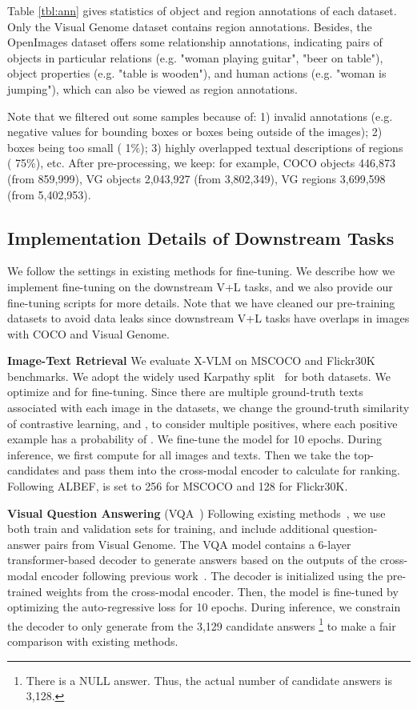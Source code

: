 \documentclass[nohyperref]{article}
\theoremstyle{plain}
\theoremstyle{definition}
\theoremstyle{remark}
\begin{document}
Table \ref{tbl:ann} gives statistics of object and region annotations of each dataset. Only the Visual Genome dataset contains region annotations. Besides, the OpenImages dataset offers some relationship annotations, indicating pairs of objects in particular relations (e.g. "woman playing guitar", "beer on table"), object properties (e.g. "table is wooden"), and human actions (e.g. "woman is jumping"), which can also be viewed as region annotations. 


Note that we filtered out some samples because of: 1) invalid annotations (e.g. negative values for bounding boxes or boxes being outside of the images); 2) boxes being too small ( 1\%); 3) highly overlapped textual descriptions of regions ( 75\%), etc. After pre-processing, we keep: for example, COCO objects 446,873 (from 859,999), VG objects 2,043,927 (from 3,802,349), VG regions 3,699,598 (from 5,402,953). 


\subsection{Implementation Details of Downstream Tasks}
\label{app:details}


We follow the settings in existing methods for fine-tuning. 
We describe how we implement fine-tuning on the downstream V+L tasks, and we also provide our fine-tuning scripts for more details. Note that we have cleaned our pre-training datasets to avoid data leaks since downstream V+L tasks have overlaps in images with COCO and Visual Genome. 


\noindent \textbf{Image-Text Retrieval} We evaluate X-VLM on MSCOCO and Flickr30K~\cite{plummer2015flickr30k} benchmarks. We adopt the widely used Karpathy split~\cite{karpathy2015deep} for both datasets. We optimize  and  for fine-tuning. Since there are multiple ground-truth texts associated with each image in the datasets, we change the ground-truth similarity of contrastive learning,  and , to consider multiple positives, where each positive example has a probability of . We fine-tune the model for 10 epochs. During inference, we first compute  for all images and texts. Then we take the top- candidates and pass them into the cross-modal encoder to calculate  for ranking. Following ALBEF,  is set to 256 for MSCOCO and 128 for Flickr30K. 


\noindent \textbf{Visual Question Answering} (VQA~\cite{goyal2017making}) Following existing methods~\cite{tan2019lxmert, chen2020uniter, li2021align}, we use both train and validation sets for training, and include additional question-answer pairs from Visual Genome. The VQA model contains a 6-layer transformer-based decoder to generate answers based on the outputs of the cross-modal encoder following previous work~\cite{cho2021unifying, li2021align}. The decoder is initialized using the pre-trained weights from the cross-modal encoder. Then, the model is fine-tuned by optimizing the auto-regressive loss for 10 epochs. During inference, we constrain the decoder to only generate from the 3,129 candidate answers \footnote{There is a NULL answer. Thus, the actual number of candidate answers is 3,128.} to make a fair comparison with existing methods.
\end{document}
